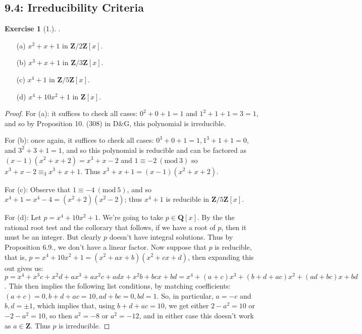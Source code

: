 \documentclass[9pt,reqno]{amsart}
\theoremstyle{definition}
\newtheorem{exercise}{Exercise}[section]
\newcommand{\zz}{\mathbf Z}
\newcommand{\qq}{\mathbf Q}
\newcommand{\Mod}[1]{\ (\mathrm{mod}\ #1)}
\begin{document}
\subsection{9.4: Irreducibility Criteria} 
\begin{exercise}[1.]. 

\begin{itemize}
	\item[(a)] $x^2 + x + 1$  in $\zz/ 2\zz  [x]$.
	\item[(b)] $x^3 + x + 1$  in $\zz/ 3\zz  [x]$.
	\item[(c)] $x^4 + 1$  in $\zz/ 5\zz  [x]$. 
	\item[(d)] $x^4 + 10x^2 + 1$ in $\zz[x]$.
\end{itemize}
\end{exercise}
\begin{proof}
	For (a): it suffices to check all cases: $0^2 + 0 + 1 = 1 $ and $1^2 + 1 + 1 = 3 =1$, and so by Proposition 10. (308) in D\&G, this polynomial is irreducible. 
	
	For (b): once again, it suffices to check all cases: $0^3 + 0 + 1 = 1, 1^3 + 1 + 1 = 0, $ and $3^2 + 3 + 1 = 1$, and so this polynomial is reducible and can be factored as $(x-1)(x^2+x+2) = x^3 + x - 2$ and $1 \equiv -2 \Mod{3}$ so $x^3 + x -2 \equiv_3 x^3 + x +1$. Thus $x^3 + x +1 = (x-1)(x^2+x+2)$. 
	
	For (c): Observe that $1 \equiv -4  \Mod{5}$, and so $x^4  + 1 = x^4 - 4 = (x^2+2)(x^2 - 2)$; thus $x^4 + 1$ is reducible in $\zz / 5 \zz[x]$.
	
	For (d): Let $p = x^4 + 10x^2 +1$. We're going to take $p  \in \qq[x]$. By the the rational root test and the collorary that follows, if we have a root of $p$, then it must be an integer. But clearly $p$ doesn't have integral solutions. Thus by Proposition 6.9., we don't have a linear factor. Now suppose that $p$ is reducible, that is, $p =x^4+10x^2+1 =  (x^2 + ax+ b)(x^2 + cx + d)$, then expanding this out gives us: $p =x^4+x^3c+x^2d+ax^3+ax^2c+adx+x^2b+bcx+bd = x^4 + (a+c)x^3+(b+d+ac)x^2 + (ad+ bc)x + bd$. This then implies the following list conditions, by matching coefficients: $(a+c) = 0, b+d+ac = 10, ad+bc = 0, bd = 1$. So, in particular, $a= -c$ and $b, d = \pm 1$, which implies that, using $b+d+ac = 10$, we get either $2-a^2 = 10$ or $-2 -a^2 = 10$, so then $a^2 = -8$ or $a^2= -12$, and in either case this doesn't work as $a \in \zz$. Thus $p$ is irreducible. 
	\end{proof}
\end{document}
